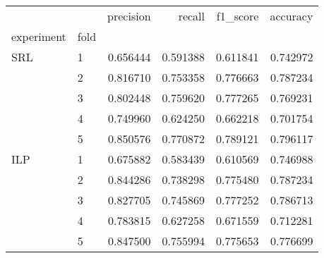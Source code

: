 \documentclass[preview]{standalone}
\begin{document}
    \begin{tabular}{llrrrr}
\toprule
    &   &  precision &    recall &  f1\_score &  accuracy \\
experiment & fold &            &           &           &           \\
\midrule
SRL & 1 &   0.656444 &  0.591388 &  0.611841 &  0.742972 \\
    & 2 &   0.816710 &  0.753358 &  0.776663 &  0.787234 \\
    & 3 &   0.802448 &  0.759620 &  0.777265 &  0.769231 \\
    & 4 &   0.749960 &  0.624250 &  0.662218 &  0.701754 \\
    & 5 &   0.850576 &  0.770872 &  0.789121 &  0.796117 \\
ILP & 1 &   0.675882 &  0.583439 &  0.610569 &  0.746988 \\
    & 2 &   0.844286 &  0.738298 &  0.775480 &  0.787234 \\
    & 3 &   0.827705 &  0.745869 &  0.777252 &  0.786713 \\
    & 4 &   0.783815 &  0.627258 &  0.671559 &  0.712281 \\
    & 5 &   0.847500 &  0.755994 &  0.775653 &  0.776699 \\
\bottomrule
\end{tabular}

    
\end{document}
